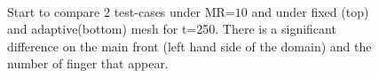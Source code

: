 \documentclass[preprint,authoryear,12pt]{elsarticle}
\begin{document}
\begin{figure}
\centering
{}\\[2mm]%
%
\caption{Start to compare $2$ test-cases under MR=$10$ and under fixed (top) and adaptive(bottom) mesh for t=250. There is a significant difference on the main front (left hand side of the domain) and the number of finger that appear.}
\label{fig:2testcase_a}
\end{figure}
\end{document}
